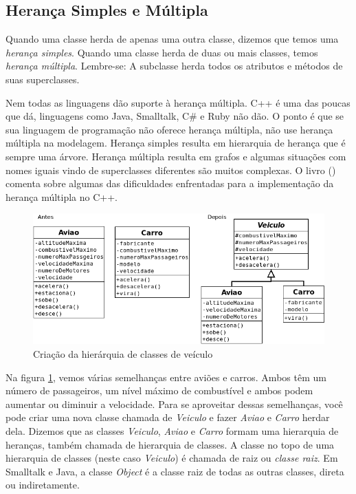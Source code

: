 \documentclass[
	11pt,				%
	openright,
	twoside,			%
	a4paper,			%
	english,			%
	french,
	brazil,				%
	sumario=tradicional
	]{abntex2}
\begin{document}
\subsection{Herança Simples e Múltipla}

Quando uma classe herda de apenas uma outra classe, dizemos que temos uma \emph{herança simples}. Quando uma classe herda de duas ou mais classes, temos \emph{herança múltipla}. Lembre-se: A subclasse herda todos os atributos e métodos de suas superclasses.

Nem todas as linguagens dão suporte à herança múltipla. C++ é uma das poucas que dá, linguagens como Java, Smalltalk, C\# e Ruby não dão. O ponto é que se sua linguagem de programação não oferece herança múltipla, não use herança múltipla na modelagem. Herança simples resulta em hierarquia de herança que é sempre uma árvore. Herança múltipla resulta em grafos e algumas situações com nomes iguais vindo de superclasses diferentes são muitos complexas. O livro () comenta sobre algumas das dificuldades enfrentadas para a implementação da herança múltipla no C++.

\begin{figure}[h]
\begin{center}
\includegraphics[scale=0.6]{uml3.png} 
\caption{Criação da hierárquia de classes de veículo} \label{fig:uml3}
\end{center}
\end{figure}

Na figura \ref{fig:uml3}, vemos várias semelhanças entre aviões e carros. Ambos têm um número de passageiros, um nível máximo de combustível e ambos podem aumentar ou diminuir a velocidade. Para se aproveitar dessas semelhanças, você pode criar uma nova classe chamada de \emph{Veiculo} e fazer \emph{Aviao} e \emph{Carro} herdar dela. Dizemos que as classes \emph{Veiculo}, \emph{Aviao} e \emph{Carro} formam uma hierarquia de heranças, também chamada de hierarquia de classes. A classe no topo de uma hierarquia de classes (neste caso \emph{Veiculo}) é chamada de raiz ou \emph{classe raiz}. Em Smalltalk e Java, a classe \emph{Object} é a classe raiz de todas as outras classes, direta ou indiretamente.
\end{document}
